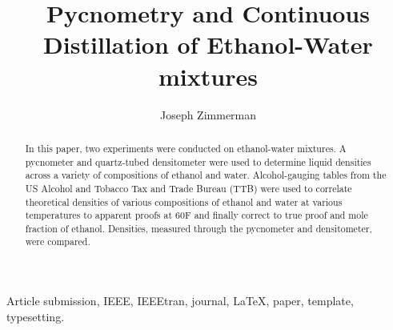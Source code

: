 \documentclass[lettersize,journal]{IEEEtran}
\begin{document}
	
	\title{Pycnometry and Continuous Distillation of Ethanol-Water mixtures}
	
	\author{Joseph Zimmerman}
	
	
	
	\maketitle
	
	\begin{abstract}
		In this paper, two experiments were conducted on ethanol-water mixtures. A pycnometer and quartz-tubed densitometer were used to determine liquid densities across a variety of compositions of ethanol and water. Alcohol-gauging tables from the US Alcohol and Tobacco Tax and Trade Bureau (TTB) were used to correlate theoretical densities of various compositions of ethanol and water at various temperatures to apparent proofs at 60F and finally correct to true proof and mole fraction of ethanol. Densities, measured through the pycnometer and densitometer, were compared. 
	\end{abstract}
	
	\begin{IEEEkeywords}
		Article submission, IEEE, IEEEtran, journal, \LaTeX, paper, template, typesetting.
	\end{IEEEkeywords}
	
\end{document}
